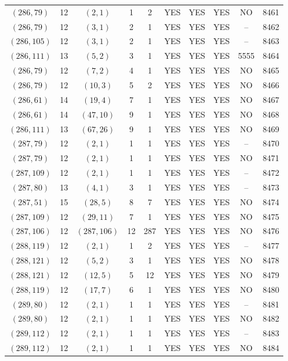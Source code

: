 \begin{longtable}{|c|c|c|c|c|c|c|c|c|c|}
$(286, 79)$ & 12 & $(2, 1)$ & 1 & 2 & YES & YES & YES & NO & 8461\\
$(286, 79)$ & 12 & $(3, 1)$ & 2 & 1 & YES & YES & YES & -- & 8462\\
$(286, 105)$ & 12 & $(3, 1)$ & 2 & 1 & YES & YES & YES & -- & 8463\\
$(286, 111)$ & 13 & $(5, 2)$ & 3 & 1 & YES & YES & YES & 5555 & 8464\\
$(286, 79)$ & 12 & $(7, 2)$ & 4 & 1 & YES & YES & YES & NO & 8465\\
$(286, 79)$ & 12 & $(10, 3)$ & 5 & 2 & YES & YES & YES & NO & 8466\\
$(286, 61)$ & 14 & $(19, 4)$ & 7 & 1 & YES & YES & YES & NO & 8467\\
$(286, 61)$ & 14 & $(47, 10)$ & 9 & 1 & YES & YES & YES & NO & 8468\\
$(286, 111)$ & 13 & $(67, 26)$ & 9 & 1 & YES & YES & YES & NO & 8469\\
$(287, 79)$ & 12 & $(2, 1)$ & 1 & 1 & YES & YES & YES & -- & 8470\\
$(287, 79)$ & 12 & $(2, 1)$ & 1 & 1 & YES & YES & YES & NO & 8471\\
$(287, 109)$ & 12 & $(2, 1)$ & 1 & 1 & YES & YES & YES & -- & 8472\\
$(287, 80)$ & 13 & $(4, 1)$ & 3 & 1 & YES & YES & YES & -- & 8473\\
$(287, 51)$ & 15 & $(28, 5)$ & 8 & 7 & YES & YES & YES & NO & 8474\\
$(287, 109)$ & 12 & $(29, 11)$ & 7 & 1 & YES & YES & YES & NO & 8475\\
$(287, 106)$ & 12 & $(287, 106)$ & 12 & 287 & YES & YES & YES & NO & 8476\\
$(288, 119)$ & 12 & $(2, 1)$ & 1 & 2 & YES & YES & YES & -- & 8477\\
$(288, 121)$ & 12 & $(5, 2)$ & 3 & 1 & YES & YES & YES & NO & 8478\\
$(288, 121)$ & 12 & $(12, 5)$ & 5 & 12 & YES & YES & YES & NO & 8479\\
$(288, 119)$ & 12 & $(17, 7)$ & 6 & 1 & YES & YES & YES & NO & 8480\\
$(289, 80)$ & 12 & $(2, 1)$ & 1 & 1 & YES & YES & YES & -- & 8481\\
$(289, 80)$ & 12 & $(2, 1)$ & 1 & 1 & YES & YES & YES & NO & 8482\\
$(289, 112)$ & 12 & $(2, 1)$ & 1 & 1 & YES & YES & YES & -- & 8483\\
$(289, 112)$ & 12 & $(2, 1)$ & 1 & 1 & YES & YES & YES & NO & 8484\\

\end{longtable}
